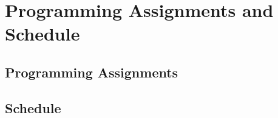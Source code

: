 \documentclass[oneside,11pt,dvipsnames]{book}
\numberwithin{equation}{section}
\theoremstyle{definition}
\theoremstyle{remark}
\newcommand{\hd}[1]{\iftoggle{usecomment}{{\color{blue}{[HD]: #1}}}{}}
\newcommand{\tool}{\texttt{NeuralSAT}}
\begin{document}


\part{Programming Assignments and Schedule}\label{part:pas-schedule}
\renewcommand{\appendixname}{Assignments}
\appendix

\chapter{Programming Assignments}\label{chap:pa}




% 

\chapter{Schedule}\label{chap:schedule}
\end{document}
